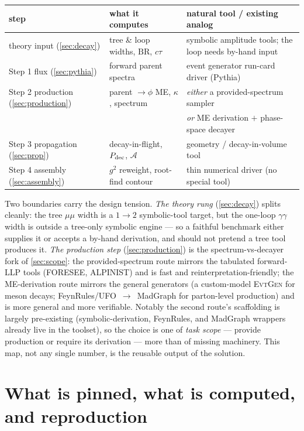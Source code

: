 \documentclass[11pt]{article}
\begin{document}
\begin{center}\footnotesize
\begin{tabular}{lll}
\toprule
step & what it computes & natural tool / existing analog \\
\midrule
theory input (\cref{sec:decay}) & tree \& loop widths, $\mathrm{BR}$, $c\tau$ & symbolic amplitude tools;
  the loop needs by-hand input \\
Step 1 flux (\cref{sec:pythia}) & forward parent spectra & event generator run-card driver (Pythia) \\
Step 2 production (\cref{sec:production}) & parent $\to\phi$ ME, $\kappa$, spectrum & \emph{either} a provided-spectrum
  sampler \\
 & & \emph{or} ME derivation $+$ phase-space decayer \\
Step 3 propagation (\cref{sec:prop}) & decay-in-flight, $P_{\rm dec}$, $\mathcal{A}$ & geometry / decay-in-volume tool \\
Step 4 assembly (\cref{sec:assembly}) & $g^2$ reweight, root-find contour & thin numerical driver (no special tool) \\
\bottomrule
\end{tabular}
\end{center}

Two boundaries carry the design tension. \emph{The theory rung} (\cref{sec:decay})
splits cleanly: the tree $\mu\mu$ width is a $1\to2$ symbolic-tool target, but the
one-loop $\gamma\gamma$ width is outside a tree-only symbolic engine --- so a
faithful benchmark either supplies it or accepts a by-hand derivation, and should
not pretend a tree tool produces it. \emph{The production step}
(\cref{sec:production}) is the spectrum-vs-decayer fork of \cref{sec:scope}: the
provided-spectrum route mirrors the tabulated forward-LLP tools (FORESEE,
ALPINIST) and is fast and reinterpretation-friendly; the ME-derivation route
mirrors the general generators (a custom-model \textsc{EvtGen} for meson decays;
FeynRules/UFO~$\to$~MadGraph for parton-level production) and is more general and
more verifiable. Notably the second route's scaffolding is largely pre-existing
(symbolic-derivation, FeynRules, and MadGraph wrappers already live in the
toolset), so the choice is one of \emph{task scope} --- provide production or
require its derivation --- more than of missing machinery. This map, not any
single number, is the reusable output of the solution.

\section{What is pinned, what is computed, and reproduction}
\label{sec:repro}
\end{document}
